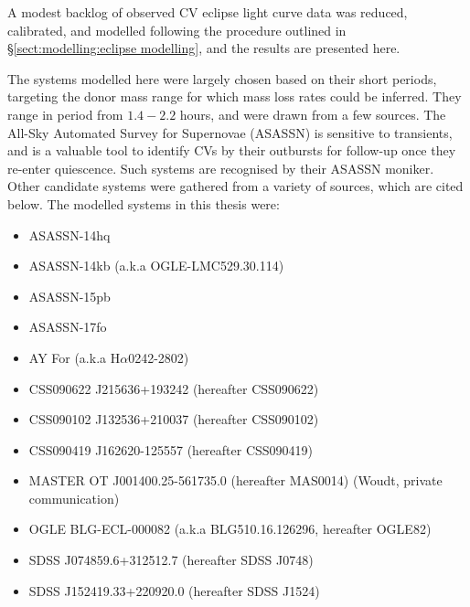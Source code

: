 \label{chpt:results:characterisation of 12 new CVs} %

A modest backlog of observed CV eclipse light curve data was reduced, calibrated, and modelled following the procedure outlined in \S\ref{sect:modelling:eclipse modelling}, and the results are presented here.

The systems modelled here were largely chosen based on their short periods, targeting the donor mass range for which mass loss rates could be inferred. They range in period from $1.4 - 2.2$ hours, and were drawn from a few sources.
The All-Sky Automated Survey for Supernovae (ASASSN) \citep{shappee2014} is sensitive to transients, and is a valuable tool to identify CVs by their outbursts for follow-up once they re-enter quiescence. Such systems are recognised by their ASASSN moniker.
Other candidate systems were gathered from a variety of sources, which are cited below.
The modelled systems in this thesis were:
\begin{itemize}
    \setlength\itemsep{0em}
    \item ASASSN-14hq
    \item ASASSN-14kb (a.k.a OGLE-LMC529.30.114)
    \item ASASSN-15pb
    \item ASASSN-17fo
    \item AY For (a.k.a H$\alpha$0242-2802) \citep{woudt2004}
    \item CSS090622 J215636+193242 (hereafter CSS090622) \citep{kato2012,thorstensen2016}
    \item CSS090102 J132536+210037 (hereafter CSS090102) \citep{kato2012}
    \item CSS090419 J162620-125557 (hereafter CSS090419) \citep{kato2012}
    \item MASTER OT J001400.25-561735.0 (hereafter MAS0014) (Woudt, private communication)
    \item OGLE BLG-ECL-000082 (a.k.a BLG510.16.126296, hereafter OGLE82) \citep{soszynski2016}
    \item SDSS J074859.6+312512.7 (hereafter SDSS J0748) \citep{kato2016}
    \item SDSS J152419.33+220920.0 (hereafter SDSS J1524) \citep{southworth2010,michel2013}
\end{itemize}

